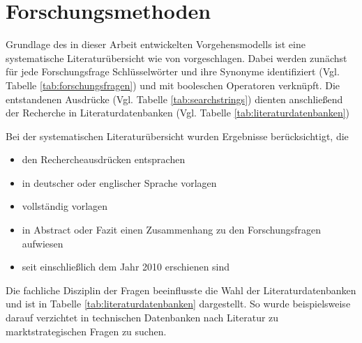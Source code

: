 \section{Forschungsmethoden}
\label{cha:method}
Grundlage des in dieser Arbeit entwickelten Vorgehensmodells ist eine 
systematische Literaturübersicht wie von  
vorgeschlagen. Dabei werden zunächst für jede Forschungsfrage Schlüsselwörter 
und ihre Synonyme identifiziert (Vgl. Tabelle 
\ref{tab:forschungsfragen}) und mit booleschen Operatoren 
verknüpft. Die entstandenen Ausdrücke (Vgl. Tabelle 
\ref{tab:searchstrings}) dienten anschließend der Recherche in 
Literaturdatenbanken (Vgl. Tabelle \ref{tab:literaturdatenbanken})


Bei der systematischen Literaturübersicht wurden Ergebnisse berücksichtigt, die
\begin{itemize}
	\item den Rechercheausdrücken entsprachen
	\item in deutscher oder englischer Sprache vorlagen
	\item vollständig vorlagen
	\item in Abstract oder Fazit einen Zusammenhang zu den Forschungsfragen 
aufwiesen
	\item seit einschließlich dem Jahr 2010 erschienen sind 
\end{itemize}

Die fachliche Disziplin der Fragen beeinflusste die Wahl der 
Literaturdatenbanken und ist in Tabelle \ref{tab:literaturdatenbanken} 
dargestellt. So wurde beispielsweise darauf verzichtet in technischen 
Datenbanken nach Literatur zu marktstrategischen Fragen zu suchen.





\begin{comment}
In diesem Kapitel erläutern Sie ihre Forschungsmethode unter Verwendung von 
entsprechenden Quellen. 
Begründen Sie auch, warum Sie sich für diese Forschungsmethode entschieden 
haben 
und warum sie geeignet ist, die vorliegende Forschungsfrage zu beantworten.
\end{comment}

